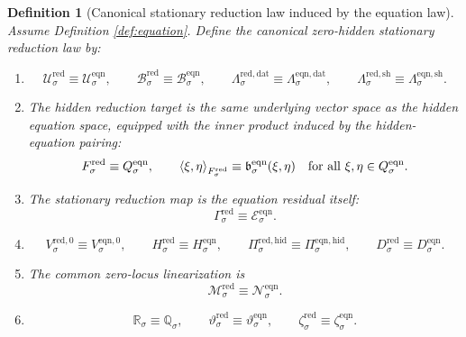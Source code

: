 \documentclass[11pt]{article}
\newcommand{\RedSpace}[1]{\mathcal U_{#1}^{\mathrm{red}}}
\newcommand{\RedBody}[1]{\mathcal B_{#1}^{\mathrm{red}}}
\newcommand{\RedData}[1]{\Lambda_{#1}^{\mathrm{red,dat}}}
\newcommand{\RedShell}[1]{\Lambda_{#1}^{\mathrm{red,sh}}}
\newcommand{\RedTarget}[1]{F_{#1}^{\mathrm{red}}}
\newcommand{\RedMap}[1]{\Gamma_{#1}^{\mathrm{red}}}
\newcommand{\RedZero}[1]{V_{#1}^{\mathrm{red},0}}
\newcommand{\RedHidden}[1]{H_{#1}^{\mathrm{red}}}
\newcommand{\RedHiddenBody}[1]{D_{#1}^{\mathrm{red}}}
\newcommand{\RedProj}[1]{\Pi_{#1}^{\mathrm{red,hid}}}
\newcommand{\RedLin}[1]{\mathcal M_{#1}^{\mathrm{red}}}
\newcommand{\RedSym}[1]{\mathbb R_{#1}}
\newcommand{\RedTime}[1]{\vartheta_{#1}^{\mathrm{red}}}
\newcommand{\RedEmbed}[1]{\zeta_{#1}^{\mathrm{red}}}
\newcommand{\EqnSpace}[1]{\mathcal U_{#1}^{\mathrm{eqn}}}
\newcommand{\EqnBody}[1]{\mathcal B_{#1}^{\mathrm{eqn}}}
\newcommand{\EqnData}[1]{\Lambda_{#1}^{\mathrm{eqn,dat}}}
\newcommand{\EqnShell}[1]{\Lambda_{#1}^{\mathrm{eqn,sh}}}
\newcommand{\EqnTarget}[1]{Q_{#1}^{\mathrm{eqn}}}
\newcommand{\EqnPair}[1]{\mathfrak b_{#1}^{\mathrm{eqn}}}
\newcommand{\EqnResidual}[1]{\mathcal E_{#1}^{\mathrm{eqn}}}
\newcommand{\EqnZero}[1]{V_{#1}^{\mathrm{eqn},0}}
\newcommand{\EqnHidden}[1]{H_{#1}^{\mathrm{eqn}}}
\newcommand{\EqnHiddenBody}[1]{D_{#1}^{\mathrm{eqn}}}
\newcommand{\EqnProj}[1]{\Pi_{#1}^{\mathrm{eqn,hid}}}
\newcommand{\EqnLin}[1]{\mathcal N_{#1}^{\mathrm{eqn}}}
\newcommand{\EqnSym}[1]{\mathbb Q_{#1}}
\newcommand{\EqnTime}[1]{\vartheta_{#1}^{\mathrm{eqn}}}
\newcommand{\EqnEmbed}[1]{\zeta_{#1}^{\mathrm{eqn}}}
\newtheorem{definition}{Definition}
\begin{document}
\begin{definition}[Canonical stationary reduction law induced by the equation law]
\label{def:canonical}
Assume Definition \ref{def:equation}. Define the canonical zero-hidden stationary reduction law by:
\begin{enumerate}
    \item
    \[
    \RedSpace{\sigma}\equiv\EqnSpace{\sigma},
    \qquad
    \RedBody{\sigma}\equiv\EqnBody{\sigma},
    \qquad
    \RedData{\sigma}\equiv\EqnData{\sigma},
    \qquad
    \RedShell{\sigma}\equiv\EqnShell{\sigma}.
    \]
    \item The hidden reduction target is the same underlying vector space as the hidden equation space, equipped with the inner product induced by the hidden-equation pairing:
    \begin{equation}
    \RedTarget{\sigma}\equiv \EqnTarget{\sigma},
    \qquad
    \ev{\xi,\eta}_{\RedTarget{\sigma}}
    \equiv
    \EqnPair{\sigma}(\xi,\eta)
    \quad
    \text{for all }\xi,\eta\in\EqnTarget{\sigma}.
    \label{eq:redinner}
    \end{equation}
    \item The stationary reduction map is the equation residual itself:
    \begin{equation}
    \RedMap{\sigma}\equiv\EqnResidual{\sigma}.
    \label{eq:redfromeqn}
    \end{equation}
    \item
    \[
    \RedZero{\sigma}\equiv\EqnZero{\sigma},
    \qquad
    \RedHidden{\sigma}\equiv\EqnHidden{\sigma},
    \qquad
    \RedProj{\sigma}\equiv\EqnProj{\sigma},
    \qquad
    \RedHiddenBody{\sigma}\equiv\EqnHiddenBody{\sigma}.
    \]
    \item The common zero-locus linearization is
    \[
    \RedLin{\sigma}\equiv\EqnLin{\sigma}.
    \]
    \item
    \[
    \RedSym{\sigma}\equiv\EqnSym{\sigma},
    \qquad
    \RedTime{\sigma}\equiv\EqnTime{\sigma},
    \qquad
    \RedEmbed{\sigma}\equiv\EqnEmbed{\sigma}.
    \]
\end{enumerate}
\end{definition}
\end{document}
